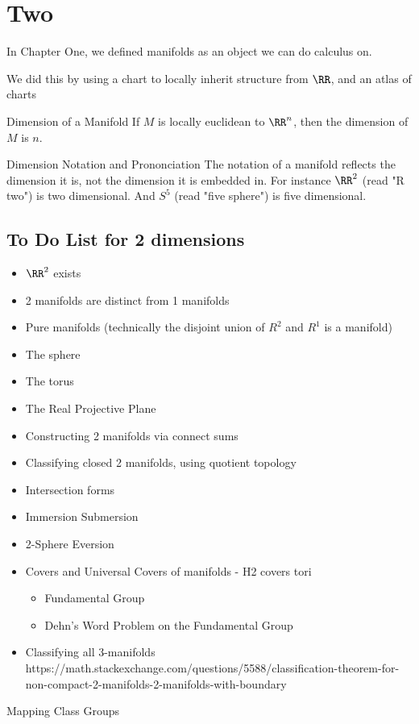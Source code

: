 \chapter{Two}


In Chapter One, we defined manifolds as an object we can do calculus on.

We did this by using a chart to locally inherit structure from \( \RR \),
    and an atlas of charts 


\begin{boxDefinition}{Dimension of a Manifold}
    If \( M \) is locally euclidean to \( \RR^n \), then the dimension of \( M \) is \( n \).
\end{boxDefinition}
\begin{boxNote}{Dimension Notation and Prononciation}
    The notation of a manifold reflects the dimension it is, not the dimension it is embedded in.
    For instance \( \RR^2 \) (read "R two") is two dimensional.
    And \( S^5 \) (read "five sphere") is five dimensional.
\end{boxNote}
\begin{boxTheorem}{}
\end{boxTheorem}

\section{To Do List for 2 dimensions}
\begin{boxTODO}{}
\begin{itemize}
\item \( \RR^2 \) exists
\item 2 manifolds are distinct from 1 manifolds
\item Pure manifolds (technically the disjoint union of \(R^2\) and \(R^1\) is a manifold)
\item The sphere
\item The torus
\item The Real Projective Plane
\item Constructing 2 manifolds via connect sums
\item Classifying closed 2 manifolds, using quotient topology
\item Intersection forms
\item Immersion Submersion
\item 2-Sphere Eversion
\item Covers and Universal Covers of manifolds - H2 covers tori
\begin{itemize}
    \item Fundamental Group
    \item Dehn's Word Problem on the Fundamental Group
\end{itemize}
\item Classifying all 3-manifolds https://math.stackexchange.com/questions/5588/classification-theorem-for-non-compact-2-manifolds-2-manifolds-with-boundary
\end{itemize}

    Mapping Class Groups

\end{boxTODO}
